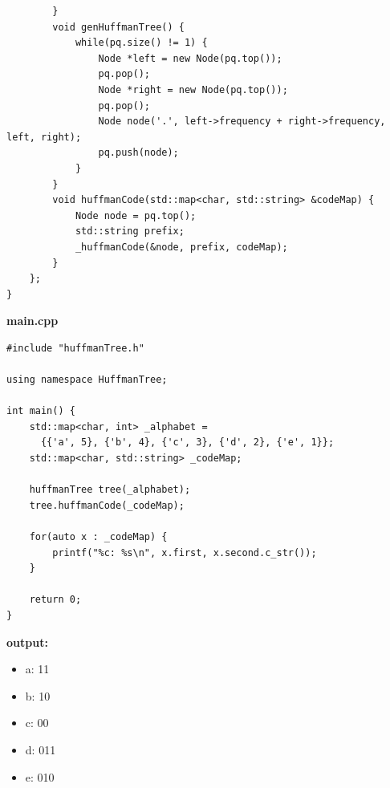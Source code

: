 \documentclass[onecolumn,oneside]{BUPTHomework}
\begin{document}
\begin{solution}
{\begin{lstlisting}
        }
        void genHuffmanTree() {
            while(pq.size() != 1) {
                Node *left = new Node(pq.top());
                pq.pop();
                Node *right = new Node(pq.top());
                pq.pop();
                Node node('.', left->frequency + right->frequency, left, right);
                pq.push(node);
            }
        }
        void huffmanCode(std::map<char, std::string> &codeMap) {
            Node node = pq.top();
            std::string prefix;
            _huffmanCode(&node, prefix, codeMap);
        }
    };
}
\end{lstlisting}

    \textbf{\textsf{main.cpp}}
\begin{lstlisting}
#include "huffmanTree.h"

using namespace HuffmanTree;

int main() {
    std::map<char, int> _alphabet = 
      {{'a', 5}, {'b', 4}, {'c', 3}, {'d', 2}, {'e', 1}};
    std::map<char, std::string> _codeMap;

    huffmanTree tree(_alphabet);
    tree.huffmanCode(_codeMap);

    for(auto x : _codeMap) {
        printf("%c: %s\n", x.first, x.second.c_str());
    }

    return 0;
}
\end{lstlisting}

    \textbf{\textsf{output:}}
    \begin{itemize}
      \item a: 11
      \item b: 10
      \item c: 00
      \item d: 011
      \item e: 010
    \end{itemize}

  }
  \end{solution}
\end{document}
